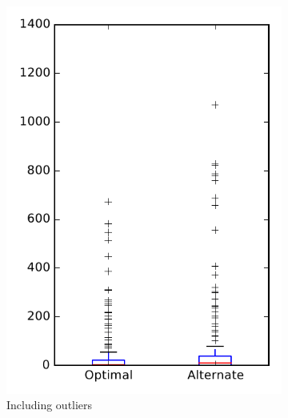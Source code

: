 
\begin{figure}
    \centering
    \begin{subfigure}{.4\textwidth}
        \centering
        \includegraphics[height=0.4\textheight]{figures/combo/flt_rq2_pig}
        \caption{Including outliers}\label{fig:combo:flt:rq2:pig_outlier}
    \end{subfigure}%
    \begin{subfigure}{.4\textwidth}
        \centering

\end{subfigure}
\end{figure}

